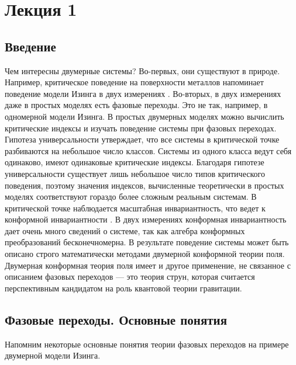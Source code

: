 \documentclass[a4paper,12pt]{article}
\theoremstyle{definition}
\theoremstyle{definition}
\theoremstyle{definition}
\begin{document}
\section{Лекция 1}
\label{sec:lecture-1}

\subsection{Введение}
\label{sec:intro}
Чем интересны двумерные системы? Во-первых, они существуют в природе. Например, критическое поведение на поверхности металлов напоминает поведение модели Изинга в двух измерениях \cite{campuzano1985110}. Во-вторых, в двух измерениях даже в простых моделях есть фазовые переходы. Это не так, например,  в одномерной модели Изинга. В простых двумерных моделях можно вычислить критические индексы и изучать поведение системы при фазовых переходах. Гипотеза универсальности утверждает, что все системы в критической точке разбиваются на небольшое число классов. Системы из одного класса ведут себя одинаково, имеют одинаковые критические индексы. Благодаря гипотезе универсальности существует лишь небольшое число типов критического поведения, поэтому значения индексов, вычисленные теоретически в простых моделях соответствуют гораздо более сложным реальным системам.
В критической точке наблюдается масштабная инвариантность, что ведет к конформной инвариантности \cite{Polyakov:1970xd}. В двух измерениях конформная инвариантность дает очень много сведений о системе, так как алгебра конформных преобразований бесконечномерна. В результате поведение системы может быть описано строго математически методами двумерной конформной теории поля. Двумерная конформная теория поля имеет и другое применение, не связанное с описанием фазовых переходов --- это теория струн, которая считается перспективным кандидатом на роль квантовой теории гравитации.

\subsection{Фазовые переходы. Основные понятия}
\label{sec:phase-transitions}

Напомним некоторые основные понятия теории фазовых переходов на примере двумерной модели Изинга.
\end{document}
